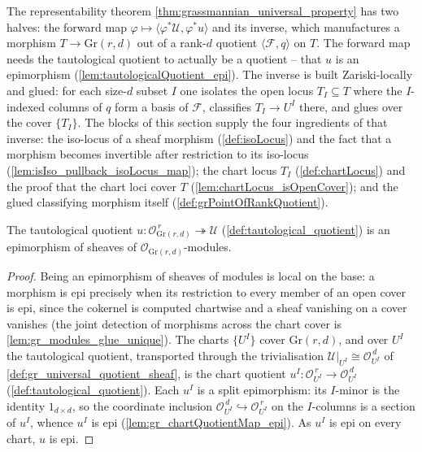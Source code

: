 The representability theorem \cref{thm:grassmannian_universal_property} has two halves:
the forward map \(\varphi \mapsto \langle \varphi^{*}\mathcal{U}, \varphi^{*}u\rangle\)
and its inverse, which manufactures a morphism \(T \to \mathrm{Gr}(r,d)\) out of a rank-\(d\)
quotient \(\langle \mathcal{F}, q\rangle\) on \(T\). The forward map needs the tautological
quotient to actually be a quotient -- that \(u\) is an epimorphism
(\cref{lem:tautologicalQuotient_epi}). The inverse is built Zariski-locally and glued: for
each size-\(d\) subset \(I\) one isolates the open locus \(T_I \subseteq T\) where the
\(I\)-indexed columns of \(q\) form a basis of \(\mathcal{F}\), classifies \(T_I \to U^I\)
there, and glues over the cover \(\{T_I\}\). The blocks of this section supply the four
ingredients of that inverse: the iso-locus of a sheaf morphism (\cref{def:isoLocus}) and
the fact that a morphism becomes invertible after restriction to its iso-locus
(\cref{lem:isIso_pullback_isoLocus_map}); the chart locus \(T_I\) (\cref{def:chartLocus})
and the proof that the chart loci cover \(T\) (\cref{lem:chartLocus_isOpenCover}); and the
glued classifying morphism itself (\cref{def:grPointOfRankQuotient}).

\begin{lemma}
  \label{lem:tautologicalQuotient_epi}
  The tautological quotient \(u : \mathcal{O}_{\mathrm{Gr}(r,d)}^{\,r}
  \twoheadrightarrow \mathcal{U}\) (\cref{def:tautological_quotient}) is an epimorphism of
  sheaves of \(\mathcal{O}_{\mathrm{Gr}(r,d)}\)-modules.
\end{lemma}
\begin{proof}
  \leanok
  Being an epimorphism of sheaves of modules is local on the base: a morphism is epi
  precisely when its restriction to every member of an open cover is epi, since the
  cokernel is computed chartwise and a sheaf vanishing on a cover vanishes
  (the joint detection of morphisms across the chart cover is
  \cref{lem:gr_modules_glue_unique}). The charts
  \(\{U^I\}\) cover \(\mathrm{Gr}(r,d)\), and over \(U^I\) the tautological quotient,
  transported through the trivialisation \(\mathcal{U}|_{U^I} \cong \mathcal{O}_{U^I}^{\,d}\)
  of \cref{def:gr_universal_quotient_sheaf}, is the chart quotient \(u^I :
  \mathcal{O}_{U^I}^{\,r} \to \mathcal{O}_{U^I}^{\,d}\) (\cref{def:tautological_quotient}).
  Each \(u^I\) is a split epimorphism: its \(I\)-minor is the identity \(1_{d\times d}\),
  so the coordinate inclusion \(\mathcal{O}_{U^I}^{\,d} \hookrightarrow
  \mathcal{O}_{U^I}^{\,r}\) on the \(I\)-columns is a section of \(u^I\), whence \(u^I\) is
  epi (\cref{lem:gr_chartQuotientMap_epi}). As \(u^I\) is epi on every chart, \(u\) is epi.
\end{proof}

